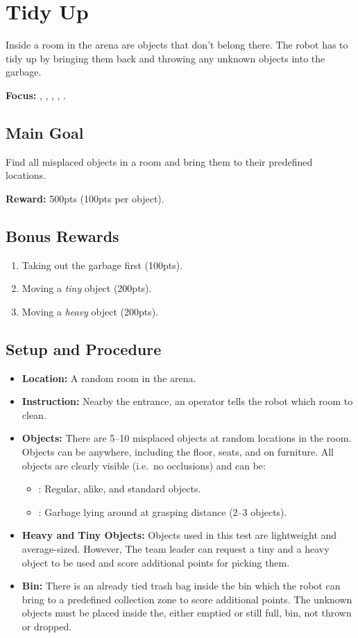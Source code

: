\section{Tidy Up}
\label{test:tidy-up}
 Inside a room in the arena are objects that don't belong there. The robot has to tidy up by bringing them back and throwing any unknown objects into the garbage.

\noindent \textbf{Focus:} \SysI, \NAV, \CV, \OR, \MAN.

\subsection*{Main Goal}
Find all misplaced objects in a room and bring them to their predefined locations.

\noindent\textbf{Reward:} 500pts (100pts per object).

\subsection*{Bonus Rewards}
\begin{enumerate}[nosep]
	\item Taking out the garbage first (100pts).
	\item Moving a \emph{tiny} object (200pts).
	\item Moving a \emph{heavy} object (200pts).
\end{enumerate}


\subsection*{Setup and Procedure}
\begin{itemize}[nosep]
	\item \textbf{Location:} A random room in the arena.
	\item \textbf{Instruction:} Nearby the entrance, an operator tells the robot which room to clean.
	\item \textbf{Objects:} There are 5--10 misplaced objects at random locations in the room. Objects can be anywhere, including the floor, seats, and on furniture.
	All objects are clearly visible (i.e.~no occlusions) and can be:
	\begin{itemize}[nosep]
		\item\KnownObjects{}: Regular, alike, and standard objects.
		\item\UnknownObjects{}: Garbage lying around at grasping distance (2--3 objects).
	\end{itemize}
	\item \textbf{Heavy and Tiny Objects:} Objects used in this test are lightweight and average-sized.
	However, The team leader can request a tiny and a heavy object to be used and score additional points for picking them.
	\item \textbf{Bin:} There is an already tied trash bag inside the bin which the robot can bring to a predefined collection zone to score additional points. The unknown objects must be placed inside the, either emptied or still full, bin, not thrown or dropped.
\end{itemize}

